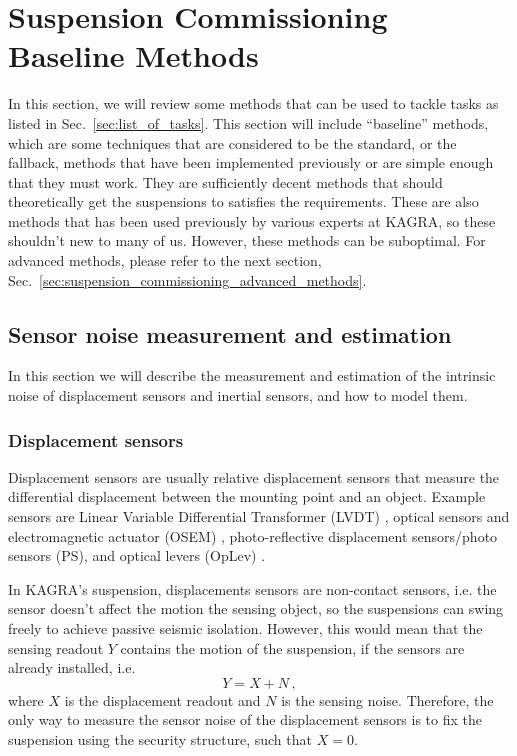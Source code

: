 \section{Suspension Commissioning Baseline Methods \label{sec:suspension_commissioning_baseline_methods}}
In this section, we will review some methods that can be used to tackle tasks as listed in Sec.~\ref{sec:list_of_tasks}.
This section will include ``baseline'' methods, which are some techniques that are considered to be the standard, or the fallback, methods that have been implemented previously or are simple enough that they must work.
They are sufficiently decent methods that should theoretically get the suspensions to satisfies the requirements.
These are also methods that has been used previously by various experts at KAGRA, so these shouldn't new to many of us.
However, these methods can be suboptimal.
For advanced methods, please refer to the next section, Sec.~\ref{sec:suspension_commissioning_advanced_methods}.

\subsection{Sensor noise measurement and estimation \label{sec:sensor_noise_measurement}}
In this section we will describe the measurement and estimation of the intrinsic noise of displacement sensors and inertial sensors, and how to model them.

\subsubsection{Displacement sensors \label{sec:displacement_sensors_baseline}}
Displacement sensors are usually relative displacement sensors that measure the differential displacement between the mounting point and an object.
Example sensors are Linear Variable Differential Transformer (LVDT) \cite{Akutsu:2021auw}, optical sensors and electromagnetic actuator (OSEM) \cite{Akutsu:2020efg, use_of_osems}, photo-reflective displacement sensors/photo sensors (PS), and optical levers (OpLev) \cite{sensing_matrices_oplev, length_sensing_oplev, optical_lever_for_kagra}.

In KAGRA's suspension, displacements sensors are non-contact sensors, i.e. the sensor doesn't affect the motion the sensing object, so the suspensions can swing freely to achieve passive seismic isolation.
However, this would mean that the sensing readout $Y$ contains the motion of the suspension, if the sensors are already installed, i.e.
\begin{equation}
	Y=X+N\,,
	\label{eqn:displacement_sensing_readout}
\end{equation}
where $X$ is the displacement readout and $N$ is the sensing noise.
Therefore, the only way to measure the sensor noise of the displacement sensors is to fix the suspension using the security structure, such that $X=0$.

